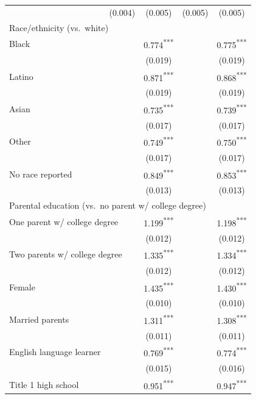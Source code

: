 \documentclass[11pt]{report}
\begin{document}
\begin{mainf}
\begin{table}[!htbp]
\begin{tabular}{@{\extracolsep{3pt}}lcccc}
& (0.004) & (0.005) & (0.005) & (0.005) \\
\multicolumn{5}{l}{Race/ethnicity (vs.\ white)} \\
\hspace{1em}Black &  & 0.774\textsuperscript{***} &  & 0.775\textsuperscript{***} \\
&  & (0.019) &  & (0.019) \\
\hspace{1em}Latino &  & 0.871\textsuperscript{***} &  & 0.868\textsuperscript{***} \\
&  & (0.019) &  & (0.019) \\
\hspace{1em}Asian &  & 0.735\textsuperscript{***} &  & 0.739\textsuperscript{***} \\
&  & (0.017) &  & (0.017) \\
\hspace{1em}Other &  & 0.749\textsuperscript{***} &  & 0.750\textsuperscript{***} \\
&  & (0.017) &  & (0.017) \\
\hspace{1em}No race reported &  & 0.849\textsuperscript{***} &  & 0.853\textsuperscript{***} \\
&  & (0.013) &  & (0.013) \\
\multicolumn{5}{l}{Parental education (vs.\ no parent w/ college degree)} \\
\multicolumn{2}{l}{\hspace{1em}One parent w/ college degree} & 1.199\textsuperscript{***} &  & 1.198\textsuperscript{***} \\
&  & (0.012) &  & (0.012) \\
\multicolumn{2}{l}{\hspace{1em}Two parents w/ college degree} & 1.335\textsuperscript{***} &  & 1.334\textsuperscript{***} \\
&  & (0.012) &  & (0.012) \\
Female &  & 1.435\textsuperscript{***} &  & 1.430\textsuperscript{***} \\
&  & (0.010) &  & (0.010) \\
Married parents &  & 1.311\textsuperscript{***} &  & 1.308\textsuperscript{***} \\
&  & (0.011) &  & (0.011) \\
English language learner &  & 0.769\textsuperscript{***} &  & 0.774\textsuperscript{***} \\
&  & (0.015) &  & (0.016) \\
Title 1 high school &  & 0.951\textsuperscript{***} &  & 0.947\textsuperscript{***} \\

\end{tabular}
\end{table}
\end{mainf}
\end{document}
